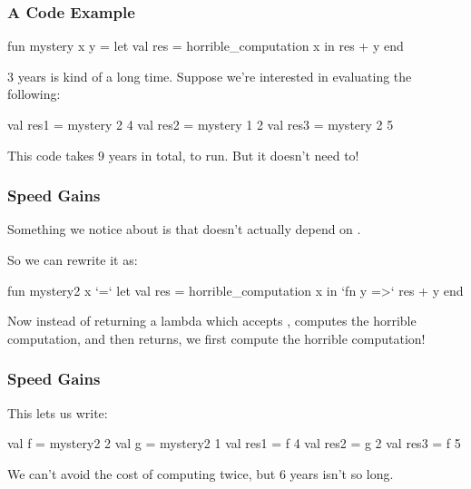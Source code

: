 \documentclass[aspectratio=169]{beamer}
\begin{document}
\begin{frame}[fragile]
  \frametitle{A Code Example}

  \begin{codeblock}
    fun mystery x y =
      let
        val res = horrible_computation x
      in
        res + y
      end
  \end{codeblock}

  \pause
  \vspace{\fill}

  3 years is kind of a long time. Suppose we're interested in evaluating the following:

  \begin{codeblock}
    val res1 = mystery 2 4
    val res2 = mystery 1 2
    val res3 = mystery 2 5
  \end{codeblock}

  \pause
  \vspace{\fill}

  This code takes 9 years in total, to run. But it doesn't need to!
\end{frame}

\begin{frame}[fragile]
  \frametitle{Speed Gains}

  Something we notice about  is that
   doesn't actually depend on .

  \pause
  \vspace{\fill}

  So we can rewrite it as:
  \begin{codeblock}
    fun mystery2 x `=`
      let
        val res = horrible_computation x
      in
        `fn y =>` res + y
      end
  \end{codeblock}

  \pause
  \vspace{\fill}

  Now instead of returning a lambda which accepts , computes the horrible
  computation, and then returns, we first compute the horrible computation!
\end{frame}

\begin{frame}[fragile]
  \frametitle{Speed Gains}

  This lets us write:

  \pause
  \begin{codeblock}
    val f = mystery2 2
    val g = mystery2 1
    val res1 = f 4
    val res2 = g 2
    val res3 = f 5
  \end{codeblock}

  \pause
  \vspace{\fill}

  We can't avoid the cost of computing  twice, but 6 years isn't so long.
\end{frame}
\end{document}
